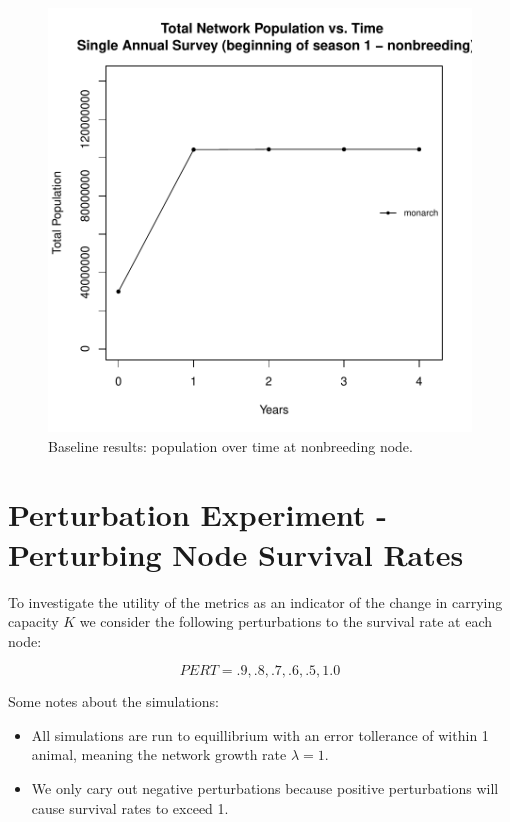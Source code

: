 \documentclass[10pt]{article}
\begin{document}
\begin{figure}[H]
\begin{center}
\includegraphics[width=.7\textwidth, height=.6\textwidth]{RGraphics-monarchbaseline}
\caption{Baseline results: population over time at nonbreeding node.}\label{fig:monarchbaseline}
\end{center}
\end{figure}

\clearpage


\section{Perturbation Experiment - Perturbing Node Survival Rates}

To investigate the utility of the metrics as an indicator of the change in carrying capacity $K$ we consider the following perturbations to the survival rate at each node:

\[PERT = .9, .8, .7, .6, .5, 1.0\]

Some notes about the simulations:
\begin{itemize}
\item All simulations are run to equillibrium with an error tollerance of within 1 animal, meaning the network growth rate $\lambda=1$.
\item We only cary out negative perturbations because positive perturbations will cause survival rates to exceed 1.
\end{itemize}
%  


\newpage 
\end{document}
